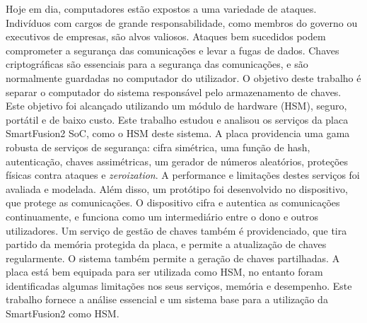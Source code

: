 \noindent Hoje em dia, computadores estão expostos a uma variedade de ataques. Indivíduos com cargos de grande responsabilidade, como membros do governo ou executivos de empresas, são alvos valiosos. Ataques bem sucedidos podem comprometer a segurança das comunicações e levar a fugas de dados. Chaves criptográficas são essenciais para a segurança das comunicações, e são normalmente guardadas no computador do utilizador. O objetivo deste trabalho é separar o computador do sistema responsável pelo armazenamento de chaves. Este objetivo foi alcançado utilizando um módulo de hardware (HSM), seguro, portátil e de baixo custo. Este trabalho estudou e analisou os serviços da placa SmartFusion2 \ac{SoC}, como o HSM deste sistema. A placa providencia uma gama robusta de serviços de segurança: cifra simétrica, uma função de hash, autenticação, chaves assimétricas, um gerador de números aleatórios, proteções físicas contra ataques e \textit{zeroization}. A performance e limitações destes serviços foi avaliada e modelada. Além disso, um protótipo foi desenvolvido no dispositivo, que protege as comunicações. O dispositivo cifra e autentica as comunicações continuamente, e funciona como um intermediário entre o dono e outros utilizadores. Um serviço de gestão de chaves também é providenciado, que tira partido da memória protegida da placa, e permite a atualização de chaves regularmente. O sistema também permite a geração de chaves partilhadas. A placa está bem equipada para ser utilizada como HSM, no entanto foram identificadas algumas limitações nos seus serviços, memória e desempenho. Este trabalho fornece a análise essencial e um sistema base para a utilização da SmartFusion2 como HSM.

